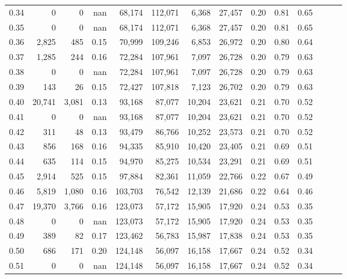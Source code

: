 \begin{tabular}{rrrrrrrrrrrrrr}
0.34 &       0 &      0 &   nan &   68,174 &  112,071 &   6,368 &  27,457 &  0.20 &  0.81 &      0.65 \\
0.35 &       0 &      0 &   nan &   68,174 &  112,071 &   6,368 &  27,457 &  0.20 &  0.81 &      0.65 \\
0.36 &   2,825 &    485 &  0.15 &   70,999 &  109,246 &   6,853 &  26,972 &  0.20 &  0.80 &      0.64 \\
0.37 &   1,285 &    244 &  0.16 &   72,284 &  107,961 &   7,097 &  26,728 &  0.20 &  0.79 &      0.63 \\
0.38 &       0 &      0 &   nan &   72,284 &  107,961 &   7,097 &  26,728 &  0.20 &  0.79 &      0.63 \\
0.39 &     143 &     26 &  0.15 &   72,427 &  107,818 &   7,123 &  26,702 &  0.20 &  0.79 &      0.63 \\
0.40 &  20,741 &  3,081 &  0.13 &   93,168 &   87,077 &  10,204 &  23,621 &  0.21 &  0.70 &      0.52 \\
0.41 &       0 &      0 &   nan &   93,168 &   87,077 &  10,204 &  23,621 &  0.21 &  0.70 &      0.52 \\
0.42 &     311 &     48 &  0.13 &   93,479 &   86,766 &  10,252 &  23,573 &  0.21 &  0.70 &      0.52 \\
0.43 &     856 &    168 &  0.16 &   94,335 &   85,910 &  10,420 &  23,405 &  0.21 &  0.69 &      0.51 \\
0.44 &     635 &    114 &  0.15 &   94,970 &   85,275 &  10,534 &  23,291 &  0.21 &  0.69 &      0.51 \\
0.45 &   2,914 &    525 &  0.15 &   97,884 &   82,361 &  11,059 &  22,766 &  0.22 &  0.67 &      0.49 \\
0.46 &   5,819 &  1,080 &  0.16 &  103,703 &   76,542 &  12,139 &  21,686 &  0.22 &  0.64 &      0.46 \\
0.47 &  19,370 &  3,766 &  0.16 &  123,073 &   57,172 &  15,905 &  17,920 &  0.24 &  0.53 &      0.35 \\
0.48 &       0 &      0 &   nan &  123,073 &   57,172 &  15,905 &  17,920 &  0.24 &  0.53 &      0.35 \\
0.49 &     389 &     82 &  0.17 &  123,462 &   56,783 &  15,987 &  17,838 &  0.24 &  0.53 &      0.35 \\
0.50 &     686 &    171 &  0.20 &  124,148 &   56,097 &  16,158 &  17,667 &  0.24 &  0.52 &      0.34 \\
0.51 &       0 &      0 &   nan &  124,148 &   56,097 &  16,158 &  17,667 &  0.24 &  0.52 &      0.34 \\

\end{tabular}
